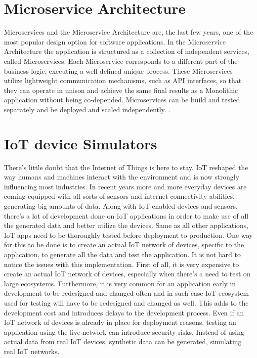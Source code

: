 \documentclass[greek,english]{article}
\begin{document}
\section{Microservice Architecture}

Microservices and the Microservice Architecture are, the last few years, one of the most popular design option for software applications. In the Microservice Architecture the application is structured as a collection of independent services, called Microservices. Each Microservice corresponds to a different part of the business logic, executing a well defined unique process\cite{monovsmicro}\cite{microservicesdef}. These Microservices utilize lightweight communication mechanisms, such as API interfaces, so that they can operate in unison and achieve the same final results as a Monolithic application without being co-depended. Microservices can be build and tested separately and be deployed and scaled independently. \cite{chandrinos_thesis}.

\section{IoT device Simulators}

There's little doubt that the Internet of Things is here to stay. IoT reshaped the way humans and machines interact with the environment and is now strongly influencing most industries. In recent years more and more everyday devices are coming equipped with all sorts of sensors and internet connectivity abilities, generating big amounts of data. Along with IoT enabled devices and sensors, there's a lot of development done on IoT applications in order to make use of all the generated data and better utilize the devices. Same as all other applications, IoT apps need to be thoroughly tested before deployment to production. One way for this to be done is to create an actual IoT network of devices, specific to the application, to generate all the data and test the application. It is not hard to notice the issues with this implementation. First of all, it is very expensive to create an actual IoT network of devices, especially when there's a need to test on large ecosystems. Furthermore, it is very common for an application early in development to be redesigned and changed often and in such case IoT ecosystem used for testing will have to be redesigned and changed as well. This adds to the development cost and introduces delays to the development process. Even if an IoT network of devices is already in place for deployment reasons, testing an application using the live network can introduce security risks. Instead of using actual data from real IoT devices, synthetic data can be generated, simulating real IoT networks. 


\end{document}
